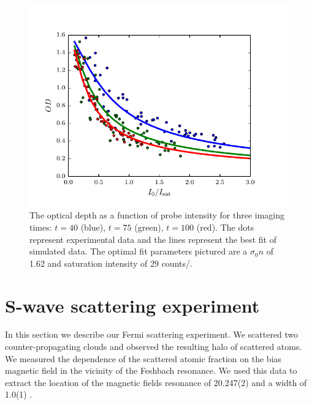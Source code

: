 \documentclass[12pt]{iopart}
\begin{document}
\begin{figure}
	\includegraphics{figure8.pdf}
\caption{The optical depth as a function of probe intensity for three imaging times: $t=40$\us{} (blue),  $t=75$\us{} (green),  $t=100$\us{} (red). The dots represent experimental data and the lines represent the best fit of simulated data. The optimal fit parameters pictured are a $\sigma_0 n$ of 1.62 and saturation intensity of 29 counts/\us{}. }  
\label{fig:isatCalib}
\end{figure}


\section{S-wave scattering experiment}
In this section we describe our Fermi scattering experiment. We scattered two counter-propagating \K{} clouds and observed the resulting \swave{} halo of scattered atoms.  We measured the dependence of the scattered atomic fraction on the bias magnetic field in the vicinity of the Feshbach resonance. We used this data to extract the location of the magnetic fields resonance of 20.247(2)  \mT{} and a width of 1.0(1)  \mT{}.
\end{document}
